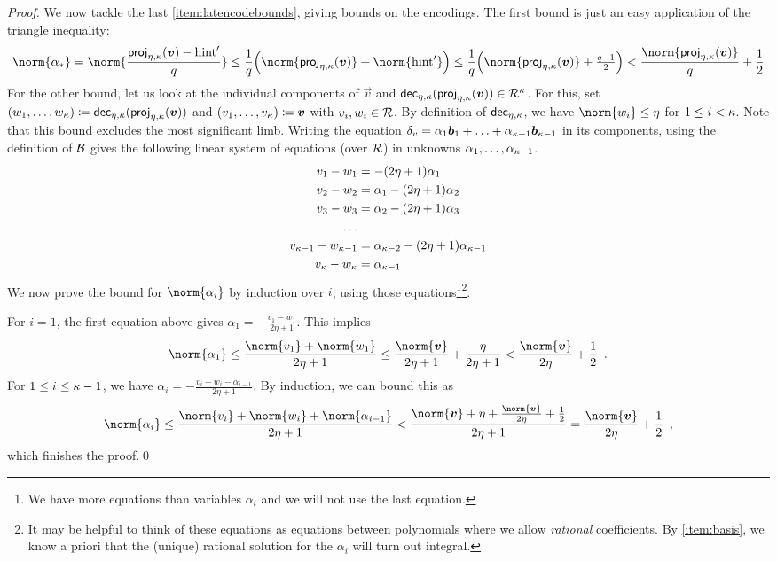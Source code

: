 \begin{proof}
\bigskip\noindent
We now tackle the last \autoref{item:latencodebounds}, giving bounds on the encodings.
The first bound is just an easy application of the triangle inequality:
\[
 \norm{\alpha_\qbasis} = \norm{ \frac{\projring(\vec{v}) - \hint'}{q}} \leq \frac{1}{q} \Bigl( \norm{\projring(\vec{v})} + \norm{\hint'}\Bigr)
 \leq \frac{1}{q}\Bigl(\norm{\projring(\vec{v})} + \tfrac{q-1}{2}\Bigr)
 < \frac{\norm{\projring(\vec{v})}}{q} + \frac{1}{2}
\]
For the other bound, let us look at the individual components of $\vec{v}$ and $\mathsf{dec}_{\eta,\kappa}(\mathsf{proj}_{\eta,\kappa}(\boldsymbol{v})) \in\mathcal{R}^\kappa$.
For this, set $(w_1,\ldots, w_{\kappa})  \coloneqq \mathsf{dec}_{\eta,\kappa}(\mathsf{proj}_{\eta,\kappa}(\boldsymbol{v}))$ and 
$(v_1,\ldots,v_{\kappa}) \coloneqq \boldsymbol{v}$ with $v_i,w_i\in\mathcal{R}$.
By definition of $\mathsf{dec}_{\eta,\kappa}$, we have $\norm{w_i}\leq \eta$ for $1\leq i < \kappa$.
Note that this bound excludes the most significant limb.
Writing the equation $\delta_v = \alpha_1\boldsymbol{b}_1 + \ldots + \alpha_{\kappa-1}\boldsymbol{b}_{\kappa-1}$ in its components, using the definition of $\mathcal{B}$ gives the following linear system of equations (over $\mathcal{R}$) in unknowns $\alpha_1,\ldots,\alpha_{\kappa-1}$.
\begin{align*}
v_1 - w_1 &= -(2\eta+1)\alpha_1\\
v_2 - w_2 &= \alpha_1 - (2\eta+1)\alpha_2\\
v_3 - w_3 &= \alpha_2 - (2\eta+1)\alpha_3\\
\ldots\\
v_{\kappa-1} - w_{\kappa-1} &= \alpha_{\kappa-2} - (2\eta+1)\alpha_{\kappa-1}\\
v_{\kappa} - w_{\kappa} &= \alpha_{\kappa-1}
\end{align*}
We now prove the bound for $\norm{\alpha_i}$ by induction over $i$, using those equations\footnote{We have more equations than variables $\alpha_i$ and we will not use the last equation.}\footnote{It may be helpful to think of these equations as equations between polynomials where we allow \emph{rational} coefficients. By \autoref{item:basis}, we know a priori that the (unique) rational solution for the $\alpha_i$ will turn out integral.}.

\smallskip\noindent
For $i=1$, the first equation above gives $\alpha_1 = -\frac{v_1-w_1}{2\eta+1}$. This implies
\[
  \norm{\alpha_1} \leq \frac{\norm{v_1} + \norm{w_1}}{2\eta+1} \leq \frac{\norm{\vec{v}}}{2\eta+1} + \frac{\eta}{2\eta+1} < \frac{\norm{\vec{v}}}{2\eta} + \frac12\enspace.
\]
For $1\leq i\leq \kappa-1$, we have $\alpha_i = -\frac{v_{i}-w_{i} - \alpha_{i-1}}{2\eta+1}$. By induction, we can bound this as
\[
 \norm{\alpha_i} 
 \leq \frac{ \norm{v_{i}} + \norm{w_{i}} + \norm{\alpha_{i-1}} } {2\eta+1}  
 < \frac{ \norm{\vec{v}} + \eta + \frac{\norm{\vec{v}}}{2\eta} + \frac{1}{2} }{2\eta+1} = \frac{\norm{\vec{v}}}{2\eta} + \frac{1}{2}\enspace,
\]
which finishes the proof.\qed
\end{proof}

